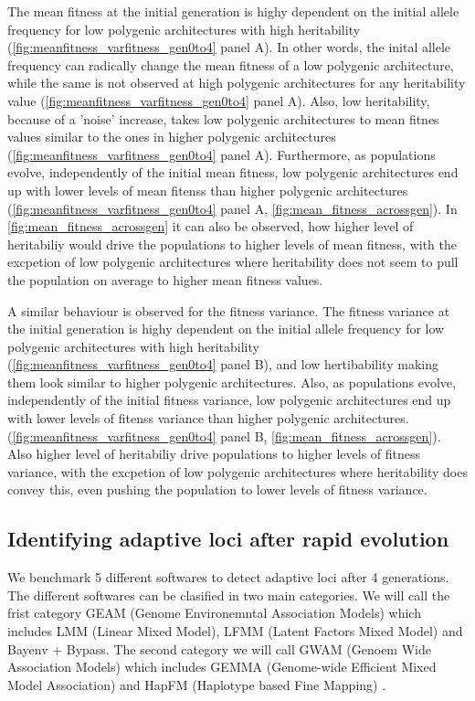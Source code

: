 \documentclass{article}
\begin{document}
The mean fitness at the initial generation is highy dependent on the initial allele frequency for low polygenic architectures with high heritability (\ref{fig:meanfitness_varfitness_gen0to4} panel A). In other words, the inital allele frequency can radically change the mean fitness of a low polygenic architecture, while the same is not observed at high polygenic architectures for any heritability value (\ref{fig:meanfitness_varfitness_gen0to4} panel A). Also, low heritability, because of a 'noise' increase, takes low polygenic architectures to mean fitnes values similar to the ones in higher polygenic architectures (\ref{fig:meanfitness_varfitness_gen0to4} panel A). Furthermore, as populations evolve, independently of the initial mean fitness, low polygenic architectures end up with lower levels of mean fitenss than higher polygenic architectures (\ref{fig:meanfitness_varfitness_gen0to4} panel A, \ref{fig:mean_fitness_acrossgen}). In \ref{fig:mean_fitness_acrossgen} it can also be observed, how higher level of heritabiliy would drive the populations to higher levels of mean fitness, with the excpetion of low polygenic architectures where heritability does not seem to pull the population on average to higher mean fitness values.

A similar behaviour is observed for the fitness variance. The fitness variance at the initial generation is highy dependent on the initial allele frequency for low polygenic architectures with high heritability (\ref{fig:meanfitness_varfitness_gen0to4} panel B), and low hertibability making them look similar to higher polygenic architectures. Also, as populations evolve, independently of the initial fitness variance, low polygenic architectures end up with lower levels of fitenss variance than higher polygenic architectures. (\ref{fig:meanfitness_varfitness_gen0to4} panel B, \ref{fig:mean_fitness_acrossgen}). Also higher level of heritabiliy drive populations to higher levels of fitness variance, with the excpetion of low polygenic architectures where heritability does convey this, even pushing the population to lower levels of fitness variance.

\subsection{Identifying adaptive loci after rapid evolution}
We benchmark 5 different softwares to detect adaptive loci after 4 generations. The different softwares can be clasified in two main categories. We will call the frist category GEAM (Genome Environemntal Association Models) which includes LMM (Linear Mixed Model), LFMM (Latent Factors Mixed Model) and Bayenv + Bypass. The second category we will call GWAM (Genoem Wide Association Models) which includes GEMMA (Genome-wide Efficient Mixed Model Association) \citep{Zhou2012-jb} and HapFM (Haplotype based Fine Mapping) \citep{Wu2022-qt}. 
\end{document}
